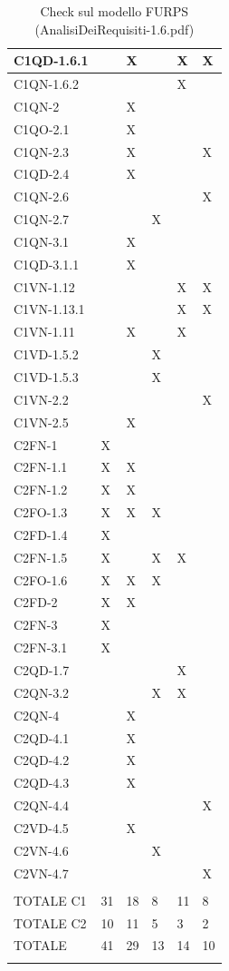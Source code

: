\begin{footnotesize}
\begin{longtable}{|p{}|p{}|p{}|p{}|p{}|p{}|}
 C1QD-1.6.1& &  X&  &  X&  X\\ \hline
 C1QN-1.6.2& &  &  &  X&  \\ \hline
 C1QN-2& &  X&  &  &  \\ \hline
 C1QO-2.1& &  X&  &  &  \\ \hline
 C1QN-2.3& &  X&  &  &  X\\ \hline
 C1QD-2.4& &  X&  &  &  \\ \hline
 C1QN-2.6& &  &  &  &  X\\ \hline
 C1QN-2.7& &  &  X&  &  \\ \hline
 C1QN-3.1& &  X&  &  &  \\ \hline
 C1QD-3.1.1& &  X&  &  &  \\ \hline
 C1VN-1.12& &  &  &  X&  X\\ \hline
 C1VN-1.13.1& &  &  &  X&  X\\ \hline
 C1VN-1.11& &  X&  &  X&  \\ \hline
 C1VD-1.5.2& &  &  X&  &  \\ \hline
 C1VD-1.5.3& &  &  X&  &  \\ \hline
 C1VN-2.2& &  &  &  &  X\\ \hline
 C1VN-2.5& &  X&  &  &  \\ \hline
 C2FN-1& X&  &  &  &  \\ \hline
 C2FN-1.1& X&  X&  &  &  \\ \hline
 C2FN-1.2& X&  X&  &  &  \\ \hline
 C2FO-1.3& X&  X&  X&  &  \\ \hline
 C2FD-1.4& X&  &  &  &  \\ \hline
 C2FN-1.5& X&  &  X&  X&  \\ \hline
 C2FO-1.6& X&  X&  X&  &  \\ \hline
 C2FD-2& X&  X&  &  &  \\ \hline
 C2FN-3& X&  &  &  &  \\ \hline
 C2FN-3.1& X&  &  &  &  \\ \hline
 C2QD-1.7& &  &  &  X&  \\ \hline
 C2QN-3.2& &  &  X&  X&  \\ \hline
 C2QN-4& &  X&  &  &  \\ \hline
 C2QD-4.1& &  X&  &  &  \\ \hline
 C2QD-4.2& &  X&  &  &  \\ \hline
 C2QD-4.3& &  X&  &  &  \\ \hline
 C2QN-4.4& &  &  &  &  X\\ \hline
 C2VD-4.5& &  X&  &  &  \\ \hline
 C2VN-4.6& &  &  X&  &  \\ \hline
 C2VN-4.7& &  &  &  &  X\\ \hline
         & &  &  &  &  \\ \hline
 TOTALE C1& 31&  18&  8&  11&  8\\ \hline
 TOTALE C2& 10&  11&  5&  3&  2\\ \hline
 TOTALE& 41&  29&  13&  14&  10\\ \hline
\caption{Check sul modello FURPS (AnalisiDeiRequisiti-1.6.pdf)}
\end{longtable}
\end{footnotesize}

